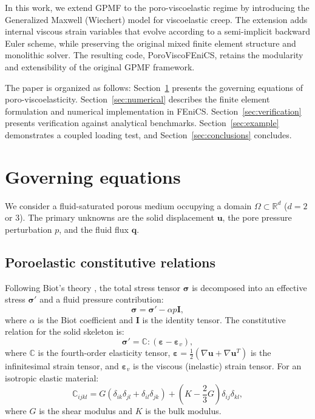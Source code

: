 \documentclass[a4paper,fleqn,longmktitle]{cas-sc}
\begin{document}
In this work, we extend GPMF to the poro-viscoelastic regime by introducing
the Generalized Maxwell (Wiechert) model for viscoelastic creep. The extension
adds internal viscous strain variables that evolve according to a semi-implicit
backward Euler scheme, while preserving the original mixed finite element
structure and monolithic solver. The resulting code, PoroViscoFEniCS, retains
the modularity and extensibility of the original GPMF framework.

The paper is organized as follows: Section~\ref{sec:governing} presents the
governing equations of poro-viscoelasticity. Section~\ref{sec:numerical}
describes the finite element formulation and numerical implementation in
FEniCS. Section~\ref{sec:verification} presents verification against
analytical benchmarks. Section~\ref{sec:example} demonstrates a coupled
loading test, and Section~\ref{sec:conclusions} concludes.

\section{Governing equations}
\label{sec:governing}

We consider a fluid-saturated porous medium occupying a domain $\Omega \subset
\mathbb{R}^d$ ($d=2$ or $3$). The primary unknowns are the solid displacement
$\bm{u}$, the pore pressure perturbation $p$, and the fluid flux $\bm{q}$.

\subsection{Poroelastic constitutive relations}

Following Biot's theory \citeyearpar{Biot1941}, the total stress tensor $\bm{\sigma}$
is decomposed into an effective stress $\bm{\sigma}'$ and a fluid pressure
contribution:
\begin{equation}
\bm{\sigma} = \bm{\sigma}' - \alpha p \bm{I},
\label{eq:total_stress}
\end{equation}
where $\alpha$ is the Biot coefficient and $\bm{I}$ is the identity tensor.
The constitutive relation for the solid skeleton is:
\begin{equation}
\bm{\sigma}' = \mathbb{C} : (\bm{\varepsilon} - \bm{\varepsilon}_v),
\label{eq:effective_stress}
\end{equation}
where $\mathbb{C}$ is the fourth-order elasticity tensor, $\bm{\varepsilon} =
\frac{1}{2}(\nabla\bm{u} + \nabla\bm{u}^T)$ is the infinitesimal strain tensor,
and $\bm{\varepsilon}_v$ is the viscous (inelastic) strain tensor. For an
isotropic elastic material:
\begin{equation}
\mathbb{C}_{ijkl} = G (\delta_{ik}\delta_{jl} + \delta_{il}\delta_{jk}) +
\left(K - \frac{2}{3}G\right) \delta_{ij}\delta_{kl},
\label{eq:elasticity_tensor}
\end{equation}
where $G$ is the shear modulus and $K$ is the bulk modulus.
\end{document}
